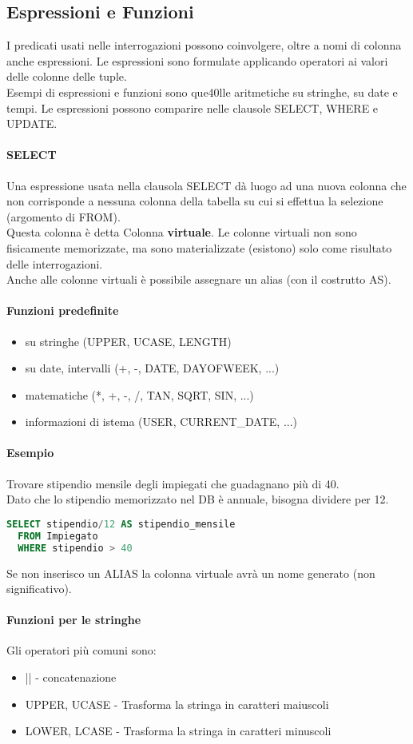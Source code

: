 \subsection{Espressioni e Funzioni}
I predicati usati nelle interrogazioni possono coinvolgere, oltre a
nomi di colonna anche espressioni. Le espressioni sono formulate
applicando operatori ai valori delle colonne delle tuple.\\
Esempi di espressioni e funzioni sono que40lle aritmetiche su stringhe,
su date e tempi. Le espressioni possono comparire nelle clausole
SELECT, WHERE e UPDATE.
\paragraph*{SELECT} Una espressione usata nella clausola SELECT
dà luogo ad una nuova colonna che non corrisponde a nessuna colonna
della tabella su cui si effettua la selezione (argomento di FROM).\\
Questa colonna è detta Colonna \textbf{virtuale}. Le colonne virtuali non sono
fisicamente memorizzate, ma sono materializzate (esistono) solo come risultato
delle interrogazioni.\\
Anche alle colonne virtuali è possibile assegnare un alias (con il
costrutto AS).\\
\paragraph*{Funzioni predefinite}
\begin{itemize}
  \item su stringhe (UPPER, UCASE, LENGTH)
  \item su date, intervalli (+, -, DATE, DAYOFWEEK, ...)
  \item matematiche (*, +, -, /, TAN, SQRT, SIN, ...)
  \item informazioni di istema (USER, CURRENT\_DATE, ...) 
\end{itemize}
\paragraph*{Esempio} Trovare stipendio mensile degli impiegati che guadagnano
più di 40.\\
Dato che lo stipendio memorizzato nel DB è annuale, bisogna dividere per 12.
\begin{lstlisting}[language=SQL]
  SELECT stipendio/12 AS stipendio_mensile
  FROM Impiegato
  WHERE stipendio > 40
\end{lstlisting}
Se non inserisco un ALIAS la colonna virtuale avrà un nome generato (non significativo).
\paragraph*{Funzioni per le stringhe}
Gli operatori più comuni sono:
\begin{itemize}
  \item || - concatenazione
  \item UPPER, UCASE - Trasforma la stringa in caratteri maiuscoli
  \item LOWER, LCASE - Trasforma la stringa in caratteri minuscoli
\end{itemize}

